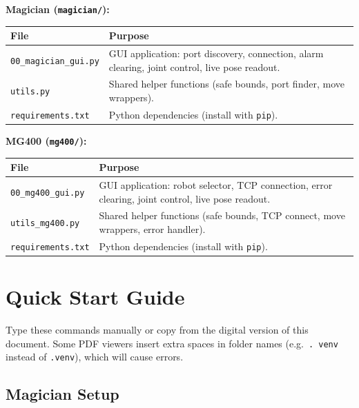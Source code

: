 \documentclass[11pt,a4paper]{article}
\begin{document}
\textbf{Magician (\texttt{magician/}):}

\renewcommand{\arraystretch}{1.4}
\begin{tabularx}{\linewidth}{@{}lX@{}}
  \toprule
  \textbf{File} & \textbf{Purpose} \\
  \midrule
  \texttt{00\_magician\_gui.py} & GUI application: port discovery, connection, alarm clearing, joint control, live pose readout. \\
  \texttt{utils.py}             & Shared helper functions (safe bounds, port finder, move wrappers). \\
  \texttt{requirements.txt}     & Python dependencies (install with \texttt{pip}). \\
  \bottomrule
\end{tabularx}

\vspace{6pt}
\textbf{MG400 (\texttt{mg400/}):}

\begin{tabularx}{\linewidth}{@{}lX@{}}
  \toprule
  \textbf{File} & \textbf{Purpose} \\
  \midrule
  \texttt{00\_mg400\_gui.py}  & GUI application: robot selector, TCP connection, error clearing, joint control, live pose readout. \\
  \texttt{utils\_mg400.py}    & Shared helper functions (safe bounds, TCP connect, move wrappers, error handler). \\
  \texttt{requirements.txt}   & Python dependencies (install with \texttt{pip}). \\
  \bottomrule
\end{tabularx}

\section{Quick Start Guide}

\begin{tcolorbox}[infobox, title={Note: Avoid PDF Copy-Paste for Commands}]
Type these commands manually or copy from the digital version of this document.
Some PDF viewers insert extra spaces in folder names
(e.g.\ \texttt{.\ venv} instead of \texttt{.venv}), which will cause errors.
\end{tcolorbox}

\subsection*{Magician Setup}
\end{document}
